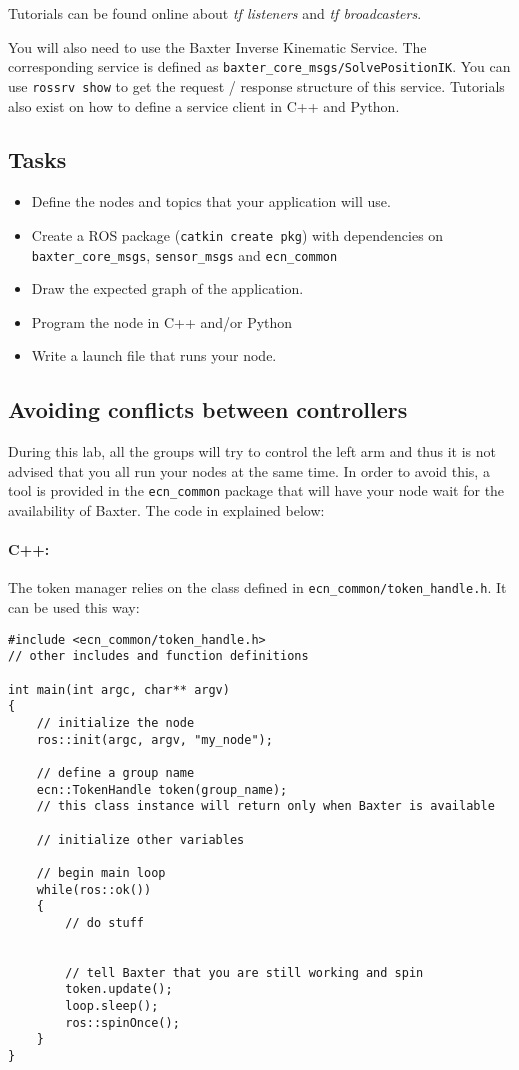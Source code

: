 \documentclass{ecnreport}
\begin{document}
Tutorials can be found online about \emph{tf listeners} and \emph{tf broadcasters}.

You will also need to use the Baxter Inverse Kinematic Service. The corresponding service is defined as \texttt{baxter\_core\_msgs/SolvePositionIK}. You can 
use \texttt{rossrv show} to get the request / response structure of this service. Tutorials also exist on how to define a service client in C++ and Python.

\subsection{Tasks}

\begin{itemize}
\item Define the nodes and topics that your application will use. 
 \item Create a ROS package (\texttt{catkin create pkg}) with dependencies on \texttt{baxter\_core\_msgs}, 
 \texttt{sensor\_msgs} and \texttt{ecn\_common}
 \item Draw the expected graph of the application. 
 \item Program the node in C++ and/or Python
 \item Write a launch file that runs your node. 
 \end{itemize}
 
 \subsection{Avoiding conflicts between controllers}
 
 During this lab, all the groups will try to control the left arm and thus it is not advised
 that you all run your nodes at the same time. In order to avoid this, a tool is provided in the  \texttt{ecn\_common}
 package that will have your node wait for the availability of Baxter. The code in explained below:
 
 \paragraph{C++: } The token manager relies on the class defined in \texttt{ecn\_common/token\_handle.h}. It can be used this way:
\cppstyle \begin{lstlisting}
#include <ecn_common/token_handle.h>
// other includes and function definitions

int main(int argc, char** argv)
{
    // initialize the node
    ros::init(argc, argv, "my_node");

    // define a group name
    ecn::TokenHandle token(group_name);
    // this class instance will return only when Baxter is available
    
    // initialize other variables

    // begin main loop
    while(ros::ok())
    {
        // do stuff
        

        // tell Baxter that you are still working and spin
        token.update();
        loop.sleep();
        ros::spinOnce();
    }
}
\end{lstlisting}
\end{document}
